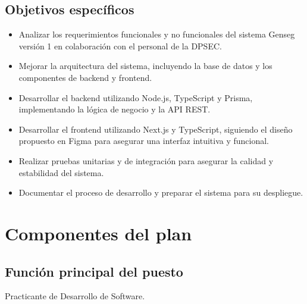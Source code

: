 \documentclass[12pt,a4paper]{article}
\begin{document}
\subsection{Objetivos específicos}
\begin{itemize}
  \item Analizar los requerimientos funcionales y no funcionales del sistema Genseg versión 1 en colaboración con el personal de la DPSEC.
  \item Mejorar la arquitectura del sistema, incluyendo la base de datos y los componentes de backend y frontend.
  \item Desarrollar el backend utilizando Node.js, TypeScript y Prisma, implementando la lógica de negocio y la API REST.
  \item Desarrollar el frontend utilizando Next.js y TypeScript, siguiendo el diseño propuesto en Figma para asegurar una interfaz intuitiva y funcional.
  \item Realizar pruebas unitarias y de integración para asegurar la calidad y estabilidad del sistema.
  \item Documentar el proceso de desarrollo y preparar el sistema para su despliegue.
\end{itemize}

\section{Componentes del plan}

\subsection{Función principal del puesto}
Practicante de Desarrollo de Software.
\end{document}
